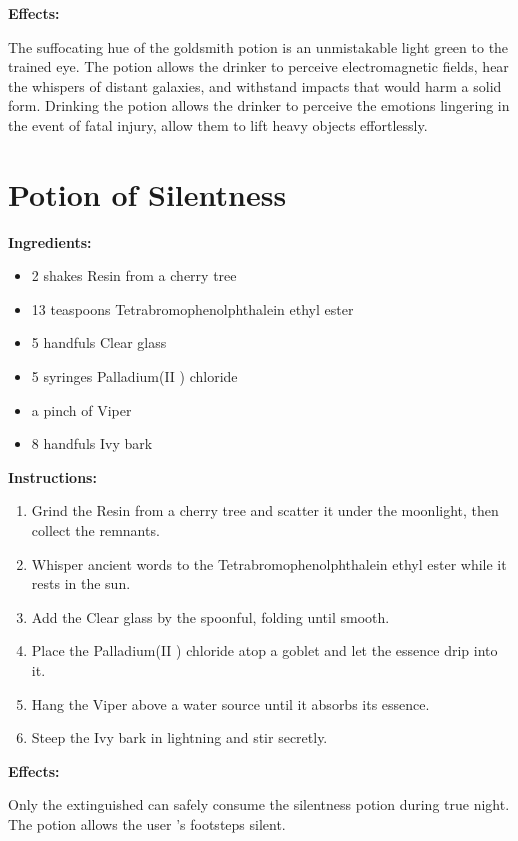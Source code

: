 \documentclass{article}
\begin{document}
\textbf{Effects:}

The suffocating hue of the goldsmith potion is an unmistakable light green to the trained eye. The potion allows the drinker to perceive electromagnetic fields, hear the whispers of distant galaxies, and withstand impacts that would harm a solid form. Drinking the potion allows the drinker to perceive the emotions lingering in the event of fatal injury, allow them to lift heavy objects effortlessly.

\newpage
\section*{Potion of Silentness}

\textbf{Ingredients:}

\begin{itemize}
  \item 2 shakes Resin from a cherry tree
  \item 13 teaspoons Tetrabromophenolphthalein ethyl ester
  \item 5 handfuls Clear glass
  \item 5 syringes Palladium(II ) chloride
  \item a pinch of Viper
  \item 8 handfuls Ivy bark
\end{itemize}

\textbf{Instructions:}

\begin{enumerate}
  \item Grind the Resin from a cherry tree and scatter it under the moonlight, then collect the remnants.
  \item Whisper ancient words to the Tetrabromophenolphthalein ethyl ester while it rests in the sun.
  \item Add the Clear glass by the spoonful, folding until smooth.
  \item Place the Palladium(II ) chloride atop a goblet and let the essence drip into it.
  \item Hang the Viper above a water source until it absorbs its essence.
  \item Steep the Ivy bark in lightning and stir secretly.
\end{enumerate}

\textbf{Effects:}

Only the extinguished can safely consume the silentness potion during true night. The potion allows the user 's footsteps silent.
\end{document}
